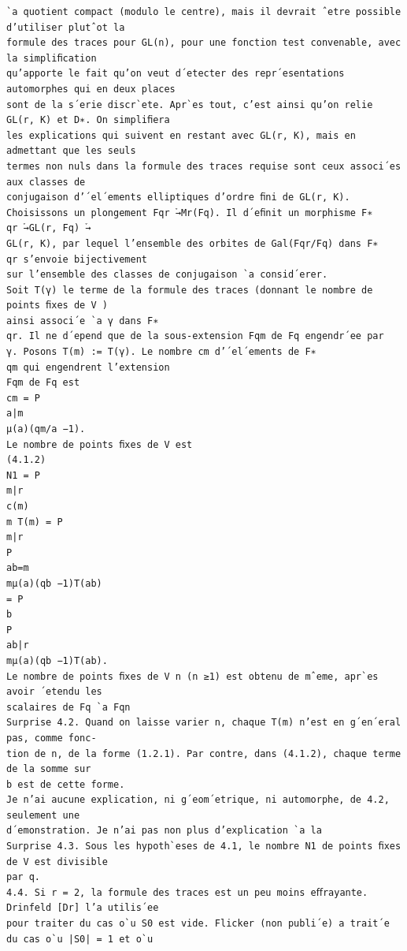 \documentclass[11pt]{article}
\begin{document}
\begin{Verbatim}[breaklines=true,fontsize=\small]
`a quotient compact (modulo le centre), mais il devrait ˆetre possible d’utiliser plutˆot la
formule des traces pour GL(n), pour une fonction test convenable, avec la simpliﬁcation
qu’apporte le fait qu’on veut d´etecter des repr´esentations automorphes qui en deux places
sont de la s´erie discr`ete. Apr`es tout, c’est ainsi qu’on relie GL(r, K) et D∗. On simpliﬁera
les explications qui suivent en restant avec GL(r, K), mais en admettant que les seuls
termes non nuls dans la formule des traces requise sont ceux associ´es aux classes de
conjugaison d’´el´ements elliptiques d’ordre ﬁni de GL(r, K).
Choisissons un plongement Fqr ֒→Mr(Fq). Il d´eﬁnit un morphisme F∗
qr ֒→GL(r, Fq) ֒→
GL(r, K), par lequel l’ensemble des orbites de Gal(Fqr/Fq) dans F∗
qr s’envoie bijectivement
sur l’ensemble des classes de conjugaison `a consid´erer.
Soit T(γ) le terme de la formule des traces (donnant le nombre de points ﬁxes de V )
ainsi associ´e `a γ dans F∗
qr. Il ne d´epend que de la sous-extension Fqm de Fq engendr´ee par
γ. Posons T(m) := T(γ). Le nombre cm d’´el´ements de F∗
qm qui engendrent l’extension
Fqm de Fq est
cm = P
a|m
µ(a)(qm/a −1).
Le nombre de points ﬁxes de V est
(4.1.2)
N1 = P
m|r
c(m)
m T(m) = P
m|r
P
ab=m
mµ(a)(qb −1)T(ab)
= P
b
P
ab|r
mµ(a)(qb −1)T(ab).
Le nombre de points ﬁxes de V n (n ≥1) est obtenu de mˆeme, apr`es avoir ´etendu les
scalaires de Fq `a Fqn
Surprise 4.2. Quand on laisse varier n, chaque T(m) n’est en g´en´eral pas, comme fonc-
tion de n, de la forme (1.2.1). Par contre, dans (4.1.2), chaque terme de la somme sur
b est de cette forme.
Je n’ai aucune explication, ni g´eom´etrique, ni automorphe, de 4.2, seulement une
d´emonstration. Je n’ai pas non plus d’explication `a la
Surprise 4.3. Sous les hypoth`eses de 4.1, le nombre N1 de points ﬁxes de V est divisible
par q.
4.4. Si r = 2, la formule des traces est un peu moins eﬀrayante. Drinfeld [Dr] l’a utilis´ee
pour traiter du cas o`u S0 est vide. Flicker (non publi´e) a trait´e du cas o`u |S0| = 1 et o`u


\end{Verbatim}
\end{document}
